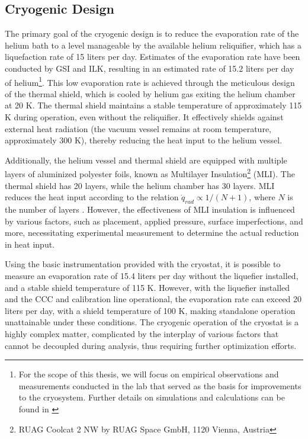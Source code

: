 \documentclass[12pt,a4paper]{report}
\begin{document}
		\subsection{Cryogenic Design}
		The primary goal of the cryogenic design is to reduce the evaporation rate of the helium bath to a level manageable by the available helium reliquifier, which has a liquefaction rate of 15 liters per day. Estimates of the evaporation rate have been conducted by GSI and ILK, resulting in an estimated rate of 15.2 liters per day of helium\footnote{For the scope of this thesis, we will focus on empirical observations and measurements conducted in the lab that served as the basis for improvements to the cryosystem. Further details on simulations and calculations can be found in \cite{DavidThesis}}. This low evaporation rate is achieved through the meticulous design of the thermal shield, which is cooled by helium gas exiting the helium chamber at 20 K. The thermal shield maintains a stable temperature of approximately 115 K during operation, even without the reliquifier. It effectively shields against external heat radiation (the vacuum vessel remains at room temperature, approximately 300 K), thereby reducing the heat input to the helium vessel.
		
		Additionally, the helium vessel and thermal shield are equipped with multiple layers of aluminized polyester foils, known as Multilayer Insulation\footnote{RUAG Coolcat 2 NW by RUAG Space GmbH, 1120 Vienna, Austria} (MLI). The thermal shield has 20 layers, while the helium chamber has 30 layers. MLI reduces the heat input according to the relation $\dot{q}_{rad} \propto 1/(N+1)$, where \(N\) is the number of layers \cite{MLI_theory}. However, the effectiveness of MLI insulation is influenced by various factors, such as placement, applied pressure, surface imperfections, and more, necessitating experimental measurement to determine the actual reduction in heat input.
		
		Using the basic instrumentation provided with the cryostat, it is possible to measure an evaporation rate of 15.4 liters per day without the liquefier installed, and a stable shield temperature of 115 K. However, with the liquefier installed and the CCC and calibration line operational, the evaporation rate can exceed 20 liters per day, with a shield temperature of 100 K, making standalone operation unattainable under these conditions. The cryogenic operation of the cryostat is a highly complex matter, complicated by the interplay of various factors that cannot be decoupled during analysis, thus requiring further optimization efforts.
		
\end{document}

